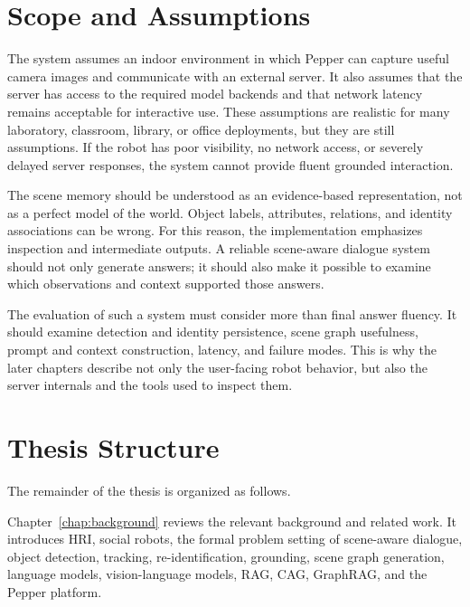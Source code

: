 \section{Scope and Assumptions}\label{sec:intro-scope}

The system assumes an indoor environment in which Pepper can capture useful camera images and communicate with an external server. It also assumes that the server has access to the required model backends and that network latency remains acceptable for interactive use. These assumptions are realistic for many laboratory, classroom, library, or office deployments, but they are still assumptions. If the robot has poor visibility, no network access, or severely delayed server responses, the system cannot provide fluent grounded interaction.

The scene memory should be understood as an evidence-based representation, not as a perfect model of the world. Object labels, attributes, relations, and identity associations can be wrong. For this reason, the implementation emphasizes inspection and intermediate outputs. A reliable scene-aware dialogue system should not only generate answers; it should also make it possible to examine which observations and context supported those answers.

The evaluation of such a system must consider more than final answer fluency. It should examine detection and identity persistence, scene graph usefulness, prompt and context construction, latency, and failure modes. This is why the later chapters describe not only the user-facing robot behavior, but also the server internals and the tools used to inspect them.

\section{Thesis Structure}\label{sec:intro-structure}

The remainder of the thesis is organized as follows.

Chapter~\ref{chap:background} reviews the relevant background and related work. It introduces HRI, social robots, the formal problem setting of scene-aware dialogue, object detection, tracking, re-identification, grounding, scene graph generation, language models, vision-language models, RAG, CAG, GraphRAG, and the Pepper platform.

